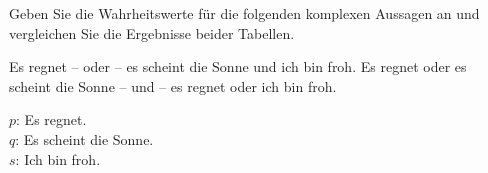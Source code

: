 \begin{frame}

Geben Sie die Wahrheitswerte für die folgenden komplexen Aussagen an und vergleichen Sie die Ergebnisse beider Tabellen.

	
	\ea\label{ex:Equi3} Es regnet -- oder -- es scheint die Sonne und ich bin froh.
	\ex\label{ex:Equi4} Es regnet oder es scheint die Sonne -- und -- es regnet oder ich bin froh.
	\z 
	
	\pause
	
	{\small 
		$p$: Es regnet.\\
		$q$: Es scheint die Sonne.\\
		$s$: Ich bin froh.}
	
	\pause
	
	\begin{minipage}{0.45\textwidth}
		\centering
		
	\end{minipage}
	\pause
	\begin{minipage}{0.5\textwidth}
		\centering
		
	\end{minipage}
	 	
\end{frame}


